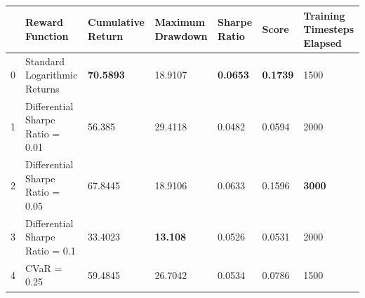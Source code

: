 \begin{tabular}{lllllll}
\toprule
 & Reward Function & Cumulative Return & Maximum Drawdown & Sharpe Ratio & Score & Training Timesteps Elapsed \\
\midrule
0 & Standard Logarithmic Returns & \textbf{70.5893} & 18.9107 & \textbf{0.0653} & \textbf{0.1739} & 1500 \\
1 & Differential Sharpe Ratio = 0.01 & 56.385 & 29.4118 & 0.0482 & 0.0594 & 2000 \\
2 & Differential Sharpe Ratio = 0.05 & 67.8445 & 18.9106 & 0.0633 & 0.1596 & \textbf{3000} \\
3 & Differential Sharpe Ratio = 0.1 & 33.4023 & \textbf{13.108} & 0.0526 & 0.0531 & 2000 \\
4 & CVaR = 0.25 & 59.4845 & 26.7042 & 0.0534 & 0.0786 & 1500 \\
\bottomrule
\end{tabular}
